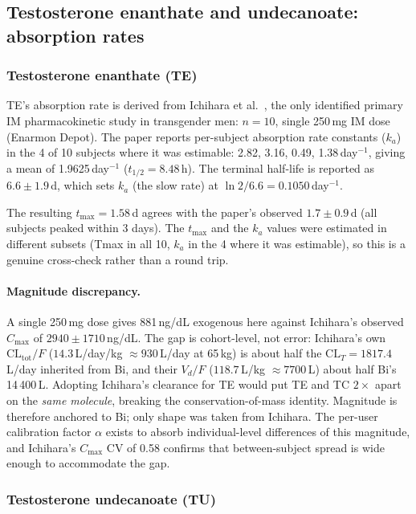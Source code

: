 \documentclass[11pt,a4paper]{article}
\begin{document}
\subsection{Testosterone enanthate and undecanoate: absorption rates}
\label{sec:te_tu}

\subsubsection{Testosterone enanthate (TE)}

TE's absorption rate is derived from Ichihara et al.~\cite{ichihara2020},
the only identified primary IM pharmacokinetic study in transgender men:
$n=10$, single 250\,mg IM dose (Enarmon Depot). The paper reports
per-subject absorption rate constants ($k_a$) in the 4 of 10 subjects
where it was estimable: 2.82, 3.16, 0.49, 1.38\,day$^{-1}$, giving a
mean of 1.9625\,day$^{-1}$ ($t_{1/2} = 8.48$\,h). The terminal half-life
is reported as $6.6 \pm 1.9$\,d, which sets $k_a$ (the slow rate) at
$\ln 2 / 6.6 = 0.1050$\,day$^{-1}$.

The resulting $t_{\max} = 1.58$\,d agrees with the paper's observed
$1.7 \pm 0.9$\,d (all subjects peaked within 3 days). The $t_{\max}$
and the $k_a$ values were estimated in different subsets (Tmax in all
10, $k_a$ in the 4 where it was estimable), so this is a genuine
cross-check rather than a round trip.

\paragraph{Magnitude discrepancy.} A single 250\,mg dose gives 881\,ng/dL
exogenous here against Ichihara's observed $C_{\max}$ of $2940 \pm
1710$\,ng/dL. The gap is cohort-level, not error: Ichihara's own
$\mathrm{CL}_{\text{tot}}/F$ ($14.3$\,L/day/kg $\approx 930$\,L/day at
65\,kg) is about half the $\mathrm{CL}_T = 1817.4$\,L/day inherited from
Bi, and their $V_d/F$ ($118.7$\,L/kg $\approx 7700$\,L) about half Bi's
14\,400\,L. Adopting Ichihara's clearance for TE would put TE and TC
$2\times$ apart on the \emph{same molecule}, breaking the
conservation-of-mass identity. Magnitude is therefore anchored to Bi;
only shape was taken from Ichihara. The per-user calibration factor
$\alpha$ exists to absorb individual-level differences of this
magnitude, and Ichihara's $C_{\max}$ CV of 0.58 confirms that
between-subject spread is wide enough to accommodate the gap.

\subsubsection{Testosterone undecanoate (TU)}
\end{document}
